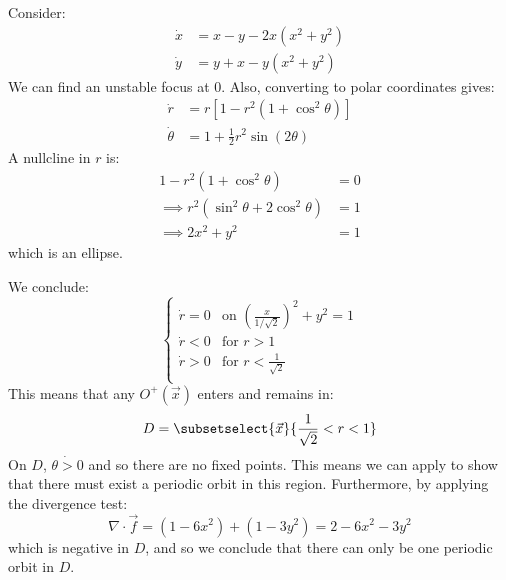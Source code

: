 \documentclass[../Main.tex]{subfiles}
\begin{document}
\begin{example}
    Consider:
    \begin{align*}
        \dot{x} &= x - y - 2x(x^2 + y^2) \\
        \dot{y} &= y + x - y(x^2 + y^2)
    \end{align*}
    We can find an unstable focus at $0$. Also, converting to polar coordinates gives:
    \begin{align*}
        \dot{r} &= r \left[1 - r^2 (1+\cos^2\theta)\right] \\
        \dot{\theta} &= 1 + \frac12 r^2 \sin(2\theta)
    \end{align*}
    A nullcline in $r$ is:
    \begin{align*}
        1 - r^2 (1 + \cos^2\theta) &= 0 \\
        \implies r^2(\sin^2 \theta + 2\cos^2\theta) &= 1 \\
        \implies 2x^2 + y^2 &= 1
    \end{align*}
    which is an ellipse.

    We conclude:
    \begin{equation*}
        \begin{cases}
            \dot{r} = 0 & \text{on }\left(\frac{x}{1 / \sqrt{2}}\right)^2 + y^2 = 1 \\
            \dot{r} < 0 & \text{for }r > 1 \\
            \dot{r} > 0 & \text{for }r < \frac{1}{\sqrt{2}} \\
        \end{cases}
    \end{equation*}
    This means that any $O^+(\vec{x})$ enters and remains in:
    \begin{equation*}
        D = \subsetselect{\vec{x}}{\frac1{\sqrt{2}} < r < 1}
    \end{equation*}
    On $D$, $\dot{\theta > 0}$ and so there are no fixed points. This means we can apply  to show that there must exist a periodic orbit in this region. Furthermore, by applying the divergence test:
    \begin{equation*}
        \nabla \cdot \vec{f} = (1-6x^2) + (1-3y^2) = 2 - 6x^2 - 3y^2
    \end{equation*}
    which is negative in $D$, and so we conclude that there can only be one periodic orbit in $D$.
\end{example}
\end{document}
